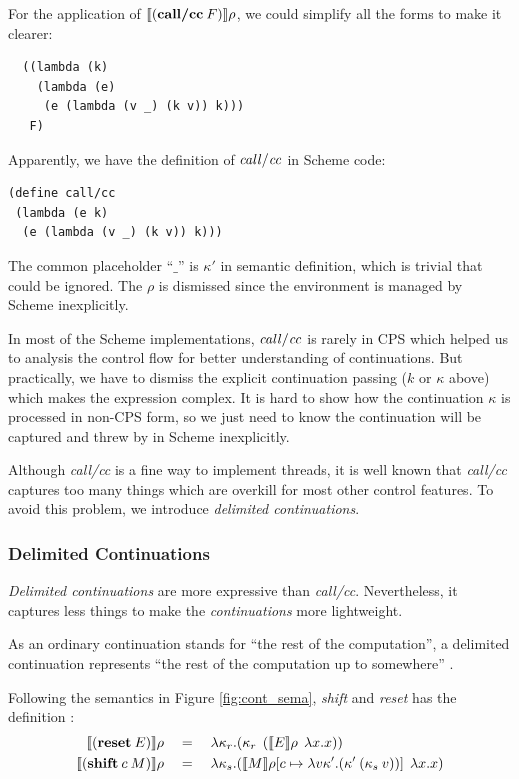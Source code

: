 \documentclass[numbers,numberedpars]{sigplanconf}
\begin{document}
For the application of $\llbracket{(\text{{\bf call/cc}}\:F)}\rrbracket\rho$, we could simplify all the forms to make it clearer:
\begin{lstlisting}
  ((lambda (k)
    (lambda (e)
     (e (lambda (v _) (k v)) k)))
   F)
\end{lstlisting}

Apparently, we have the definition of ${\it call/cc}$ in Scheme code:
\begin{lstlisting}
(define call/cc
 (lambda (e k)
  (e (lambda (v _) (k v)) k)))
\end{lstlisting}

The common placeholder  ``$\_$'' is $\kappa'$ in semantic definition, which is trivial that could be ignored.
The $\rho$ is dismissed since the environment is managed by Scheme inexplicitly.

In most of the Scheme implementations, ${\it call/cc}$ is rarely in CPS which helped us to analysis the control flow for better understanding
of continuations.
But practically, we have to dismiss the explicit continuation passing ($k$ or $\kappa$ above) which makes the expression complex.
It is hard to show how the continuation $\kappa$ is processed in non-CPS form, so we just need to know the continuation will be captured and
threw by in Scheme inexplicitly.

Although {\it call/cc} is a fine way to implement threads, it is well known that {\it call/cc} captures too many things which are overkill for most
other control features. To avoid this problem, we introduce {\it delimited continuations}.

\subsubsection{Delimited Continuations} \label{Delimited Continuations}

{\it Delimited continuations} are more expressive than {\it call/cc}.
Nevertheless, it captures less things to make the {\it continuations} more lightweight.

As an ordinary continuation stands for ``the rest of the computation'', a delimited continuation represents
``the rest of the computation up to somewhere'' \citep{sumii2000implementation}.

Following the semantics in Figure \ref{fig:cont_sema}, {\it shift} and {\it reset} has the definition \citep{Danvy92representingcontrol:}:
\begin{align*}
  \llbracket{(\text{{\bf reset}}\:E)}\rrbracket\rho \quad&=\quad \lambda{\kappa_r}.(\kappa_r\:\: (\llbracket{E}\rrbracket\rho\:\: \lambda{x}.x))
  \\
  \llbracket{(\text{{\bf shift}}\:c\:M)}\rrbracket\rho \quad&=\quad
  \lambda{\kappa_s}.(\llbracket{M}\rrbracket\rho[c\mapsto\lambda{v\kappa'}.(\kappa'\:(\kappa_s\:v))]\:\:\lambda{x}.x)
\end{align*}
\end{document}
